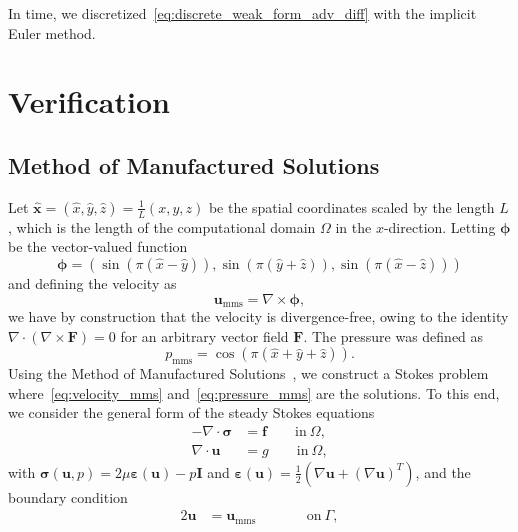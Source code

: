 \documentclass[fleqn]{wlscirep}
\newcommand{\ff}{\mathbf{f}}
\newcommand{\uu}{\mathbf{u}}
\newcommand{\xx}{\bm{x}}
\newcommand{\bsig}{\bm{\sigma}}
\newcommand{\beps}{\bm{\varepsilon}}
\begin{document}
In time, we discretized~\eqref{eq:discrete_weak_form_adv_diff} with the implicit Euler method.

\section{Verification}\label{sec:appB_verification}
\subsection{Method of Manufactured Solutions}\label{subsec:mms}
Let $\hat{\xx} = (\hat{x}, \hat{y}, \hat{z}) = \frac{1}{L}(x, y, z)$ be the spatial coordinates scaled by the length $L$, which is the length of the computational domain $\Omega$ in the $x$-direction. Letting $\bm{\phi}$ be the vector-valued function
\begin{equation*}
    \bm{\phi} = \left(\sin{(\pi(\hat{x} - \hat{y}))}, \sin{(\pi(\hat{y} + \hat{z}))}, \sin{(\pi(\hat{x} - \hat{z}))}\right)
\end{equation*}
and defining the velocity as 
\begin{equation}
    \uu_{\mathrm{mms}} = \nabla\times\bm{\phi},
    \label{eq:velocity_mms}
\end{equation}
we have by construction that the velocity is divergence-free, owing to the identity $\nabla\cdot(\nabla\times\mathbf{F}) = 0$ for an arbitrary vector field $\mathbf{F}$. The pressure was defined as
\begin{equation}
    p_{\mathrm{mms}} = \cos{(\pi(\hat{x} + \hat{y} + \hat{z}))}.
    \label{eq:pressure_mms}
\end{equation}
Using the Method of Manufactured Solutions~\cite{Roache2001CodeSolutions}, we construct a Stokes problem where~\eqref{eq:velocity_mms} and~\eqref{eq:pressure_mms} are the solutions. To this end, we consider the general form of the steady Stokes equations
\begin{subequations}
    \begin{align}
        -\nabla\cdot\bsig &= \ff \qquad\mathrm{in \ }\Omega,\\
        \nabla\cdot\uu &= g \qquad\mathrm{in \ }\Omega,
    \end{align}
    \label{eq:stokes_mms}%
\end{subequations}%
with $\bsig(\uu, p) = 2\mu\beps(\uu) - p\mathbf{I}$ and $\beps(\uu) = \frac{1}{2}\left(\nabla\uu + (\nabla\uu)^T\right)$, and the boundary condition
\begin{alignat}{2}
    \uu &= \uu_{\mathrm{mms}} \qquad&&\mathrm{on \ }\Gamma,
\end{alignat}
\end{document}
